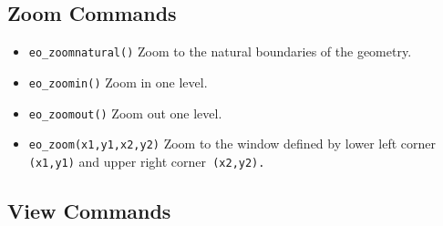 \subsection{Zoom Commands}

\begin{itemize}
\item \texttt{eo\_zoomnatural()} Zoom to the natural boundaries of the geometry.

\item \texttt{eo\_zoomin()} Zoom in one level.

\item \texttt{eo\_zoomout()} Zoom out one level.

\item \texttt{eo\_zoom(x1,y1,x2,y2)} Zoom to the window defined by lower left corner
\texttt{(x1,y1)} and upper right corner\texttt{ (x2,y2).}
\end{itemize}



\subsection{View Commands}

